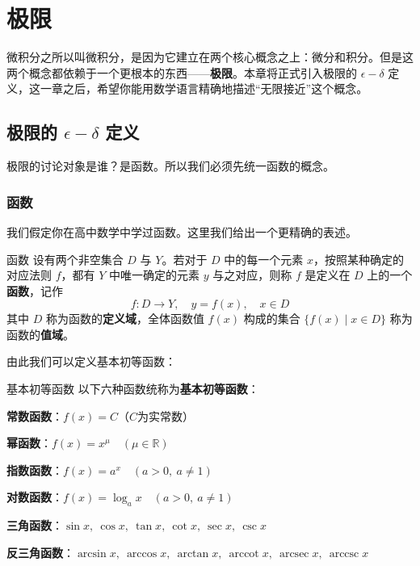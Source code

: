 \chapter{极限}

微积分之所以叫微积分，是因为它建立在两个核心概念之上：微分和积分。但是这两个概念都依赖于一个更根本的东西——\textbf{极限}。本章将正式引入极限的 $\epsilon-\delta$ 定义，这一章之后，希望你能用数学语言精确地描述“无限接近”这个概念。

\section{极限的 $\epsilon-\delta$ 定义}

极限的讨论对象是谁？是函数。所以我们必须先统一函数的概念。

\subsection{函数}

我们假定你在高中数学中学过函数。这里我们给出一个更精确的表述。

\begin{definition}{函数}{}
设有两个非空集合 $D$ 与 $Y$。若对于 $D$ 中的每一个元素 $x$，按照某种确定的对应法则 $f$，都有 $Y$ 中唯一确定的元素 $y$ 与之对应，则称 $f$ 是定义在 $D$ 上的一个\textbf{函数}，记作
\[
f: D \to Y, \quad y = f(x), \quad x \in D
\]
其中 $D$ 称为函数的\textbf{定义域}，全体函数值 $f(x)$ 构成的集合 $\{f(x) \mid x \in D\}$ 称为函数的\textbf{值域}。
\end{definition}

由此我们可以定义基本初等函数：
\begin{definition}{基本初等函数}{}
  以下六种函数统称为\textbf{基本初等函数}：

\textbf{常数函数}：\(f(x) = C\)（$C$为实常数）

\textbf{幂函数}：\(f(x) = x^{\mu} \quad (\mu \in \mathbb{R})\)

\textbf{指数函数}：\(f(x) = a^{x} \quad (a > 0,\ a \neq 1)\)

\textbf{对数函数}：\(f(x) = \log_{a} x \quad (a > 0,\ a \neq 1)\)

\textbf{三角函数}：\(\sin x,\ \cos x,\ \tan x,\ \cot x,\ \sec x,\ \csc x\)

\textbf{反三角函数}：\(\arcsin x,\ \arccos x,\ \arctan x,\ \operatorname{arccot} x,\ \operatorname{arcsec} x,\ \operatorname{arccsc} x\)

\end{definition}

